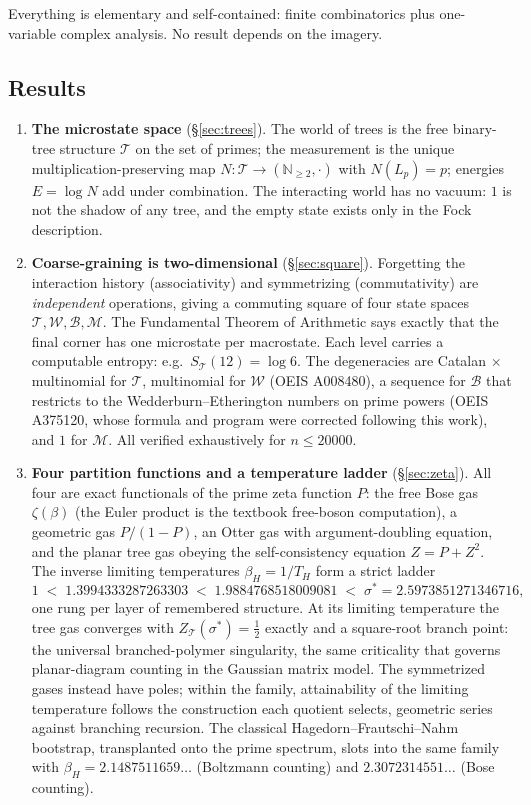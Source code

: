 \documentclass[11pt]{article}
\newcommand{\cT}{\mathcal{T}}   %
\newcommand{\cW}{\mathcal{W}}   %
\newcommand{\cB}{\mathcal{B}}   %
\newcommand{\cM}{\mathcal{M}}   %
\newcommand{\NN}{\mathbb{N}}
\numberwithin{equation}{section}
\theoremstyle{plain}
\theoremstyle{definition}
\theoremstyle{remark}
\begin{document}
Everything is elementary and self-contained: finite combinatorics plus one-variable
complex analysis. No result depends on the imagery.

\subsection{Results}

\begin{enumerate}
\item \textbf{The microstate space} (\S\ref{sec:trees}). The world of trees is the
free binary-tree structure $\cT$ on the set of primes; the measurement is the unique
multiplication-preserving map $N\colon \cT \to (\NN_{\ge2},\cdot)$ with $N(L_p) = p$;
energies $E = \log N$ add under combination. The interacting world has no vacuum: $1$
is not the shadow of any tree, and the empty state exists only in the Fock
description.

\item \textbf{Coarse-graining is two-dimensional} (\S\ref{sec:square}). Forgetting the
interaction history (associativity) and symmetrizing (commutativity) are
\emph{independent} operations, giving a commuting square of four state spaces
$\cT, \cW, \cB, \cM$. The Fundamental Theorem of Arithmetic says exactly that the
final corner has one microstate per macrostate. Each level carries a computable
entropy: e.g.\ $S_\cT(12) = \log 6$. The degeneracies are Catalan $\times$ multinomial
for $\cT$, multinomial for $\cW$ (OEIS A008480), a sequence for $\cB$ that restricts
to the Wedderburn--Etherington numbers on prime powers (OEIS A375120, whose formula
and program were corrected following this work), and $1$ for $\cM$. All verified
exhaustively for $n \le 20000$.

\item \textbf{Four partition functions and a temperature ladder}
(\S\ref{sec:zeta}). All
four are exact functionals of the prime zeta function $P$: the free Bose gas
$\zeta(\beta)$ (the Euler product is the textbook free-boson computation), a
geometric gas $P/(1-P)$, an Otter gas with argument-doubling equation, and the planar
tree gas obeying the self-consistency equation $Z = P + Z^2$. The inverse limiting
temperatures $\beta_H = 1/T_H$ form a strict ladder
\[
1 \;<\; 1.3994333287263303 \;<\; 1.9884768518009081 \;<\; \sigma^{*} = 2.5973851271346716 ,
\]
one rung per layer of remembered structure. At its limiting temperature the tree gas
converges with $Z_\cT(\sigma^{*}) = \tfrac12$ exactly and a square-root branch point:
the universal branched-polymer singularity, the same criticality that governs
planar-diagram counting in the Gaussian matrix model. The symmetrized gases instead
have poles; within the family, attainability of the limiting temperature follows
the construction each quotient selects, geometric series against branching
recursion. The classical Hagedorn--Frautschi--Nahm bootstrap, transplanted onto
the prime spectrum, slots into the same family with
$\beta_H = 2.1487511659\dots$ (Boltzmann counting) and $2.3072314551\dots$ (Bose
counting).


\end{enumerate}
\end{document}
